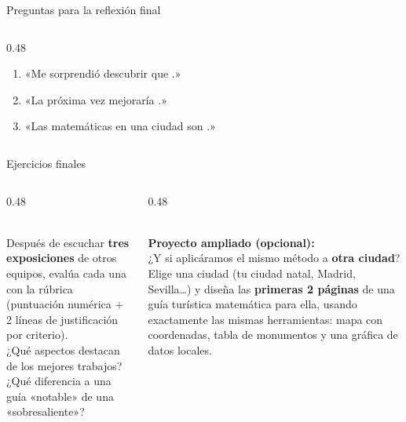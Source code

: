 \documentclass[aspectratio=169, 10pt, spanish]{beamer}
\begin{document}
\begin{frame}{Preguntas para la reflexión final}
\begin{columns}[T]
\begin{column}{0.48\textwidth}
\begin{tcolorbox}
\begin{enumerate}
                porque \underline{\hspace{2cm}}.»
          \item «Me sorprendió descubrir que
                \underline{\hspace{3cm}}.»
          \item «La próxima vez mejoraría
                \underline{\hspace{3cm}}.»
          \item «Las matemáticas en una ciudad
                son \underline{\hspace{3cm}}.»
        \end{enumerate}
      \end{tcolorbox}
    \end{column}
  \end{columns}
\end{frame}


\begin{frame}{Ejercicios finales}
  \begin{columns}[T]
    \begin{column}{0.48\textwidth}
      \begin{evaluarbox}
        \AlmFontFootnote{}\\[4pt]
        Después de escuchar \textbf{tres exposiciones}
        de otros equipos, evalúa cada una con la rúbrica
        (puntuación numérica + 2 líneas de justificación
        por criterio).\\[6pt]
        ¿Qué aspectos destacan de los mejores trabajos?
        ¿Qué diferencia a una guía «notable» de una
        «sobresaliente»?
      \end{evaluarbox}
    \end{column}
    \begin{column}{0.48\textwidth}
      \begin{crearbox}
        \AlmFontFootnote{}\\[4pt]
        \textbf{Proyecto ampliado (opcional):}\\[6pt]
        ¿Y si aplicáramos el mismo método a
        \textbf{otra ciudad}? Elige una ciudad
        (tu ciudad natal, Madrid, Sevilla\ldots)
        y diseña las \textbf{primeras 2 páginas}
        de una guía turística matemática para ella,
        usando exactamente las mismas herramientas:
        mapa con coordenadas, tabla de monumentos
        y una gráfica de datos locales.
      \end{crearbox}
    \end{column}
  \end{columns}
\end{frame}
\end{document}
